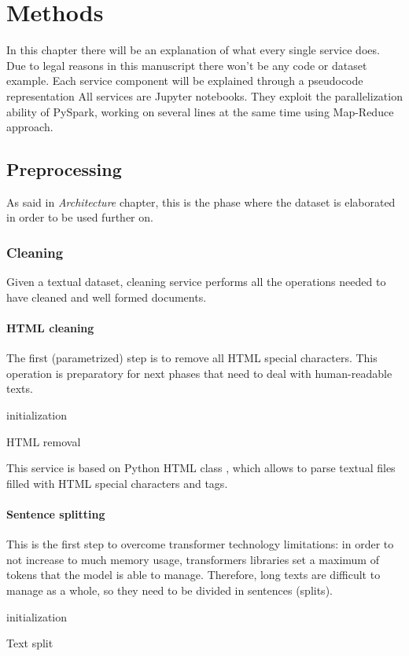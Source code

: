 \documentclass[\main/main.tex]{subfiles}
\begin{document}
\chapter{Methods}
In this chapter there will be an explanation of what every single service does. Due to legal reasons in this manuscript there won't be any code or dataset example. Each service component will be explained through a pseudocode representation
All services are Jupyter notebooks. They exploit the parallelization ability of PySpark, working on several lines at the same time using Map-Reduce approach.
\section{Preprocessing}
As said in \textit{Architecture} chapter, this is the phase where the dataset is elaborated in order to be used further on. 
\subsection{Cleaning}
Given a textual dataset, cleaning service performs all the operations needed to have cleaned and well formed documents.
\subsubsection{HTML cleaning}
The first (parametrized) step is to remove all HTML special characters. This operation is preparatory for next phases that need to deal with human-readable texts.
\begin{center}
    \begin{algorithm}[H]
     initialization
     \caption{HTML removal}
    \end{algorithm}
\end{center}
This service is based on Python HTML class \cite{html_parser}, which allows to parse textual files filled with HTML special characters and tags.
\subsubsection{Sentence splitting}
This is the first step to overcome transformer technology limitations: in order to not increase to much memory usage, transformers libraries set a maximum of tokens that the model is able to manage. Therefore, long texts are difficult to manage as a whole, so they need to be divided in sentences (splits).
\begin{center}
    \begin{algorithm}[H]
     initialization
     \caption{Text split}
    \end{algorithm}
\end{center}
\end{document}
